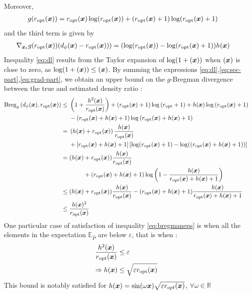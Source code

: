 Moreover,
\begin{align}
g(r_{{\mathrm{opt}}}(\boldsymbol{x})) &= r_{{\mathrm{opt}}}(\boldsymbol{x})\log(r_{{\mathrm{opt}}}(\boldsymbol{x})) + (r_{{\mathrm{opt}}}(\boldsymbol{x}) +1)\log(r_{{\mathrm{opt}}}(\boldsymbol{x})+1)\label{eq:sec-part} \end{align}
and the third term is given by 
\begin{align}
\nabla_{\boldsymbol{x}_t} g(r_{{\mathrm{opt}}}(\boldsymbol{x}))(d_{\phi}(\boldsymbol{x}) - r_{{\mathrm{opt}}}(\boldsymbol{x}))) &= (\log(r_{{\mathrm{opt}}}(\boldsymbol{x})) - \log(r_{{\mathrm{opt}}}(\boldsymbol{x})+1))h(\boldsymbol{x})\label{eq:grad-part}
\end{align}
Inequality \ref{eq:dl} results from the Taylor expansion of $\log(1+(\boldsymbol{x}))$ when $(\boldsymbol{x})$ is close to zero, as $\log(1+(\boldsymbol{x})) \leq (\boldsymbol{x})$.
By summing the expressions \ref{eq:dl},\ref{eq:sec-part},\ref{eq:grad-part}, we obtain an upper bound on the $g$-Bregman divergence between the true and estimated density ratio : 
\begin{align}
    \text{Breg}_{g}\left(d_{\phi}(\boldsymbol{x}),r_{{\mathrm{opt}}}(\boldsymbol{x})\right) &\leq 
    \begin{aligned}[t]
    &\left(1+\frac{h^{2}(\boldsymbol{x})}{r_{{\mathrm{opt}}}(\boldsymbol{x})} \right) + \left(r_{{\mathrm{opt}}}(\boldsymbol{x}) +1 \right) \log\left( r_{{\mathrm{opt}}}+1\right) + h(\boldsymbol{x})\log\left(r_{{\mathrm{opt}}}(\boldsymbol{x}) +1 \right)  \\
    &- \left(r_{{\mathrm{opt}}}(\boldsymbol{x}) + h(\boldsymbol{x}) + 1\right)\log\left( r_{{\mathrm{opt}}}(\boldsymbol{x}) + h(\boldsymbol{x}) + 1\right)\end{aligned}
    \\
    &=\begin{aligned}[t]
    &\left(h(\boldsymbol{x}) + r_{{\mathrm{opt}}}(\boldsymbol{x})\right)\frac{h(\boldsymbol{x})}{r_{{\mathrm{opt}}}(\boldsymbol{x})}   \\
    &+\left[r_{{\mathrm{opt}}}(\boldsymbol{x}) + h(\boldsymbol{x}) + 1\right]\left[\log(r_{{\mathrm{opt}}}(\boldsymbol{x})+1) - \log(\left(r_{{\mathrm{opt}}}(\boldsymbol{x}) + h(\boldsymbol{x}) + 1\right))  \right]
    \end{aligned}
    \\
    &=\begin{aligned}[t]
    (h(\boldsymbol{x}) &+ r_{{\mathrm{opt}}}(\boldsymbol{x}))\frac{h(\boldsymbol{x})}{r_{{\mathrm{opt}}}(\boldsymbol{x})}  \\
    & +\left(r_{{\mathrm{opt}}}(\boldsymbol{x}) + h(\boldsymbol{x}) + 1\right)\log\left( 1 - \frac{h(\boldsymbol{x})}{r_{{\mathrm{opt}}}(\boldsymbol{x}) + h(\boldsymbol{x}) + 1}\right)
    \end{aligned}
    \\
    &\leq
    \begin{aligned}
    (h(\boldsymbol{x}) + r_{{\mathrm{opt}}}(\boldsymbol{x}))\frac{h(\boldsymbol{x})}{r_{{\mathrm{opt}}}(\boldsymbol{x})} 
    - (r_{{\mathrm{opt}}}(\boldsymbol{x}) + h(\boldsymbol{x}) +1)\frac{h(\boldsymbol{x})}{r_{{\mathrm{opt}}}(\boldsymbol{x})+h(\boldsymbol{x}) + 1}
    \end{aligned}
    \\
    &\leq \frac{h(\boldsymbol{x})^{2}}{r_{{\mathrm{opt}}}(\boldsymbol{x})}
\end{align}
One particular case of satisfaction of inequality \ref{eq:bregmaneps} is when all the elements in the expectation $\mathbb{E}_{\hat{P}}$ are below $\varepsilon$, that is when : \begin{align}
    \frac{h^{2}(\boldsymbol{x})}{r_{{\mathrm{opt}}}(\boldsymbol{x})} &\leq \varepsilon \\
    \Rightarrow h(\boldsymbol{x}) &\leq \sqrt{\varepsilon r_{{\mathrm{opt}}}(\boldsymbol{x})}
\end{align}
This bound is notably satisfied for $h(\boldsymbol{x}) = \sin(\omega \boldsymbol{x})\sqrt{\varepsilon r_{opt}(\boldsymbol{x})} $, $\forall \omega \in \mathbb{R}$
